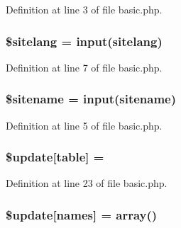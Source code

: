 Definition at line 3 of file basic.\+php.

\subsubsection[{\texorpdfstring{\$sitelang}{$sitelang}}]{\setlength{\rightskip}{0pt plus 5cm}\$sitelang = {\bf input}(\textquotesingle{}sitelang\textquotesingle{})}\hypertarget{basic_8php_a833ed990741564193a3d27b17fb41b85}{}\label{basic_8php_a833ed990741564193a3d27b17fb41b85}


Definition at line 7 of file basic.\+php.

\subsubsection[{\texorpdfstring{\$sitename}{$sitename}}]{\setlength{\rightskip}{0pt plus 5cm}\$sitename = {\bf input}(\textquotesingle{}sitename\textquotesingle{})}\hypertarget{basic_8php_ac01e858d3012ea85184c30f6f4edd45f}{}\label{basic_8php_ac01e858d3012ea85184c30f6f4edd45f}


Definition at line 5 of file basic.\+php.

\subsubsection[{\texorpdfstring{\$update}{$update}}]{\setlength{\rightskip}{0pt plus 5cm}\${\bf update}\mbox{[}\textquotesingle{}table\textquotesingle{}\mbox{]} = \textquotesingle{}}\hypertarget{basic_8php_aee7ba5985ddf023a93862ab77e9718f9}{}\label{basic_8php_aee7ba5985ddf023a93862ab77e9718f9}


Definition at line 23 of file basic.\+php.

\subsubsection[{\texorpdfstring{\$update}{$update}}]{\setlength{\rightskip}{0pt plus 5cm}\${\bf update}\mbox{[}\textquotesingle{}names\textquotesingle{}\mbox{]} = array(\textquotesingle{})}\hypertarget{basic_8php_abcf5ad2e4fef35de04bef0168cc91ddc}{}\label{basic_8php_abcf5ad2e4fef35de04bef0168cc91ddc}


